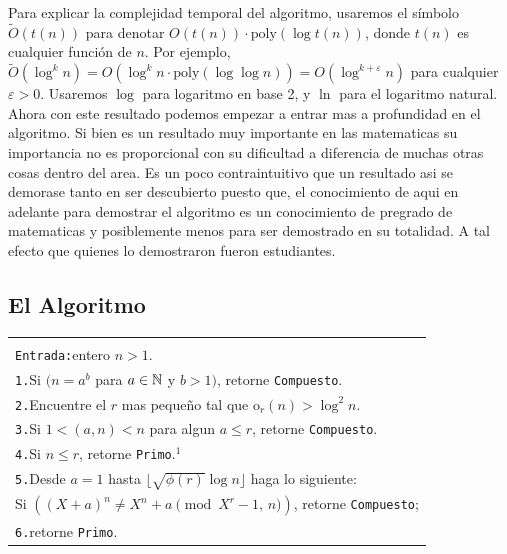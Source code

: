 \documentclass{article}
\begin{document}
Para explicar la complejidad temporal del algoritmo, usaremos el símbolo $\tilde{O}(t(n))$ para denotar $O(t(n)) \cdot \text{poly}(\log t(n))$,
donde $t(n)$ es cualquier función de $n$.  Por ejemplo,
$\tilde{O}(\log^k n) = O(\log^k n \cdot \text{poly}(\log \log n)) = O(\log^{k+\varepsilon} n)$
para cualquier $\varepsilon > 0$. Usaremos $\log$ para logaritmo en base 2,
y $\ln$ para el logaritmo natural. \\


Ahora con este resultado podemos empezar a entrar mas a profundidad en el algoritmo. Si bien es un resultado muy importante en las matematicas
su importancia no es proporcional con su dificultad a diferencia de muchas otras cosas dentro del area. Es un poco contraintuitivo que 
un resultado asi se demorase tanto en ser descubierto puesto que, el conocimiento de aqui en adelante para demostrar el algoritmo es un conocimiento
de pregrado de matematicas y posiblemente menos para ser demostrado en su totalidad. A tal efecto que quienes lo demostraron fueron estudiantes.\\


\subsection{El Algoritmo}

\begin{center}
\begin{tabular}{|p{}|}
\hline
\\
\texttt{Entrada:}\quad entero $n > 1$.\\[6pt]
\texttt{1.}\quad Si $(n = a^b$ para $a \in \mathbb{N}$ y $b > 1)$, retorne \texttt{Compuesto}.\\[6pt]
\texttt{2.}\quad Encuentre el $r$ mas pequeño tal que $\mathrm{o}_r(n) > \log^2 n$.\\[6pt]
\texttt{3.}\quad Si $1 < (a, n) < n$ para algun $a \leq r$, retorne \texttt{Compuesto}.\\[6pt]
\texttt{4.}\quad Si $n \leq r$, retorne \texttt{Primo}.$^1$\\[6pt]
\texttt{5.}\quad Desde $a = 1$ hasta $\lfloor\sqrt{\phi(r)}\log n\rfloor$ haga lo siguiente:\\[4pt]
\qquad\qquad Si $\left((X + a)^n \neq X^n + a \pmod{X^r - 1,\, n}\right)$, retorne \texttt{Compuesto};\\[6pt]
\texttt{6.}\quad retorne \texttt{Primo}.\\[6pt]
\hline
\end{tabular}
\end{center}
\end{document}
